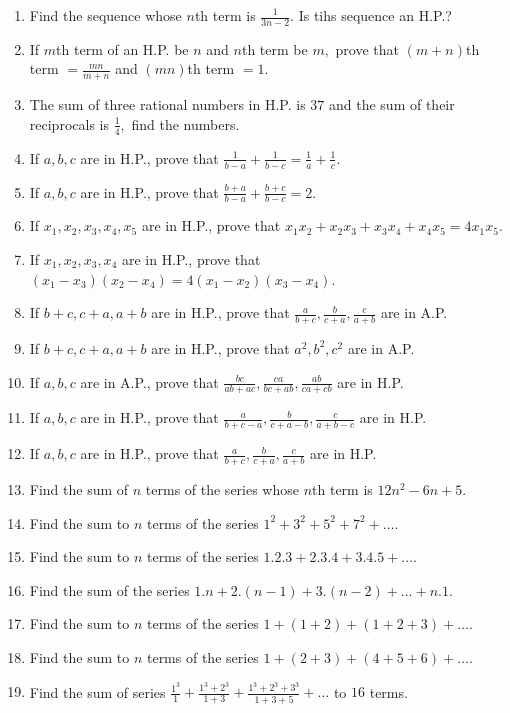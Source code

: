 \begin{enumerate}
\item Find the sequence whose $n$th term is $\frac{1}{3n - 2}.$ Is tihs sequence an H.P.?
\item If $m$th term of an H.P. be $n$ and $n$th term be $m,$ prove that $(m + n)$th term $= \frac{mn}{m + n}$ and $(mn)$th term $=
  1$.
\item The sum of three rational numbers in H.P. is $37$ and the sum of their reciprocals is $\frac{1}{4},$ find the numbers.
\item If $a, b, c$ are in H.P., prove that $\frac{1}{b - a} + \frac{1}{b - c} = \frac{1}{a} + \frac{1}{c}$.
\item If $a, b, c$ are in H.P., prove that $\frac{b + a}{b - a} + \frac{b + c}{b - c} = 2$.
\item If $x_1, x_2, x_3, x_4, x_5$ are in H.P., prove that $x_1x_2 + x_2x_3 + x_3x_4 + x_4x_5 = 4x_1x_5$.
\item If $x_1, x_2, x_3, x_4$ are in H.P., prove that $(x_1 - x_3)(x_2 - x_4) = 4(x_1 - x_2)(x_3 - x_4)$.
\item If $b + c, c + a, a + b$ are in H.P., prove that $\frac{a}{b + c}, \frac{b}{c + a}, \frac{c}{a + b}$ are in A.P.
\item If $b + c, c + a, a + b$ are in H.P., prove that $a^2, b^2, c^2$ are in A.P.
\item If $a, b, c$ are in A.P., prove that $\frac{bc}{ab + ac}, \frac{ca}{bc + ab}, \frac{ab}{ca + cb}$ are in H.P.
\item If $a, b, c$ are in H.P., prove that $\frac{a}{b + c - a}, \frac{b}{c + a - b}, \frac{c}{a + b - c}$ are in H.P.
\item If $a, b, c$ are in H.P., prove that $\frac{a}{b + c}, \frac{b}{c + a}, \frac{c}{a + b}$ are in H.P.
\item Find the sum of $n$ terms of the series whose $n$th term is $12n^2 - 6n + 5$.
\item Find the sum to $n$ terms of the series $1^2 + 3^2 + 5^2 + 7^2 + \ldots$.
\item Find the sum to $n$ terms of the series $1.2.3 + 2.3.4 + 3.4.5 + \ldots$.
\item Find the sum of the series $1.n + 2.(n - 1) + 3.(n - 2) + \ldots + n.1$.
\item Find the sum to $n$ terms of the series $1 + (1 + 2) + (1 + 2 + 3) + \ldots$.
\item Find the sum to $n$ terms of the series $1 + (2 + 3) + (4 + 5 + 6) + \ldots$.
\item Find the sum of series $\frac{1^3}{1} + \frac{1^3 + 2^3}{1 + 3} + \frac{1^3 + 2^3 + 3^3}{1 + 3 + 5} + \ldots$ to $16$ terms.

\end{enumerate}
